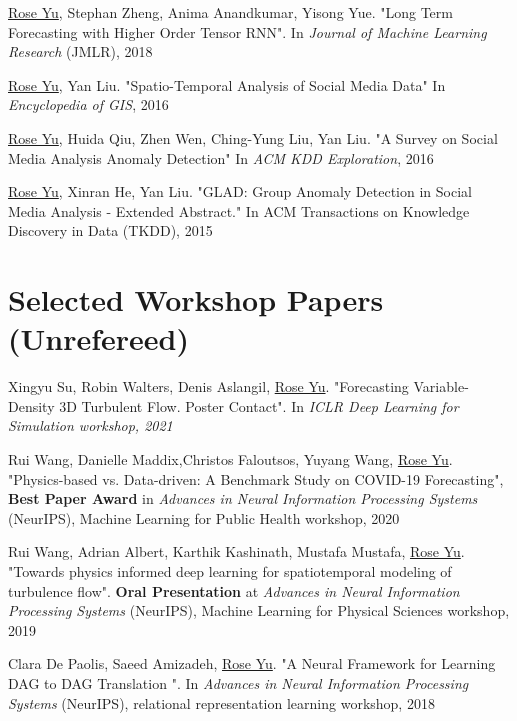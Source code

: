 \documentclass[margin,line]{res}
\begin{document}
\begin{resume}
\begin{enumerate}[label={[J\arabic*]}]
\item \underline{Rose Yu}, Stephan Zheng, Anima Anandkumar, Yisong Yue. "Long Term Forecasting with Higher Order Tensor RNN". In  \textit{ Journal of Machine Learning Research} (JMLR), 2018



\item \underline{Rose Yu},  Yan Liu.  "Spatio-Temporal Analysis of Social Media Data"  In \textit{Encyclopedia of GIS}, 2016

\item \underline{Rose Yu}, Huida Qiu, Zhen Wen, Ching-Yung Liu,  Yan Liu. "A Survey on Social Media Analysis  Anomaly Detection" In \textit{ACM KDD Exploration},  2016

\item \underline{Rose Yu}, Xinran He, Yan Liu. "GLAD: Group Anomaly Detection in Social Media Analysis - Extended Abstract." In \textit{}ACM Transactions on Knowledge Discovery in Data  (TKDD), 2015
\end{enumerate}


 
\section{\sc Selected
Workshop
Papers
(Unrefereed) }
\begin{enumerate}[label={[W\arabic*]}]
\item Xingyu Su,  Robin Walters,  Denis Aslangil, \underline{Rose Yu}.
"Forecasting Variable-Density 3D Turbulent Flow. Poster Contact".  In \textit{ICLR Deep Learning for Simulation workshop, 2021}

\item Rui Wang, Danielle Maddix,Christos Faloutsos, Yuyang Wang, \underline{Rose Yu}. "Physics-based vs. Data-driven: A Benchmark Study on COVID-19 Forecasting",  \textbf{Best Paper Award}  in \textit{Advances in Neural Information Processing Systems} (NeurIPS), Machine Learning for Public Health workshop, 2020



\item Rui Wang, Adrian Albert, Karthik Kashinath, Mustafa Mustafa, \underline{Rose Yu}. "Towards physics informed deep learning for spatiotemporal modeling of turbulence flow". \textbf{Oral Presentation} at \textit{Advances in Neural Information Processing Systems} (NeurIPS), Machine Learning for Physical Sciences  workshop, 2019

\item Clara De Paolis, Saeed Amizadeh, \underline{Rose Yu}.  "A Neural Framework for Learning DAG to DAG Translation ". In  \textit{Advances in Neural Information Processing Systems} (NeurIPS), relational representation learning workshop, 2018


\end{enumerate}
\end{resume}
\end{document}

